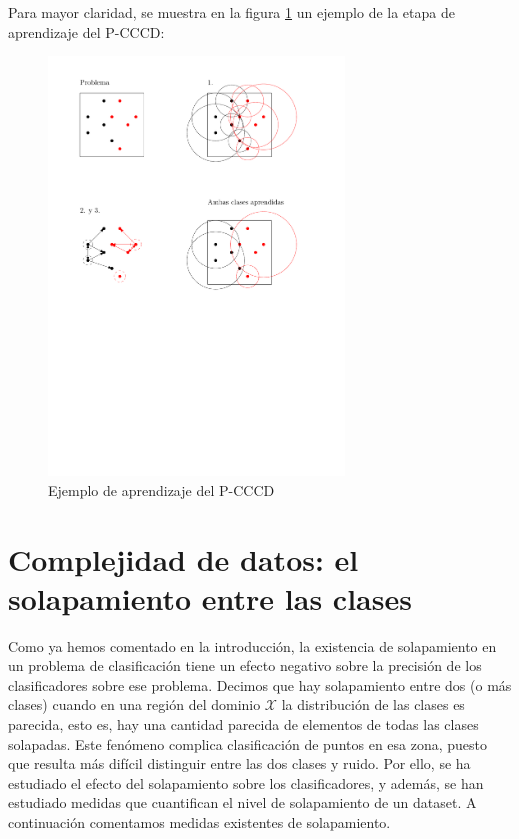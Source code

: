 \documentclass[a4paper,12pt]{report}
\theoremstyle{definition}
\begin{document}
Para mayor claridad, se muestra en la figura \ref{fig:pcccd} un ejemplo de la etapa de aprendizaje del P-CCCD:

\begin{figure}[H]
  \centering
  \includegraphics[width=0.7\textwidth]{imgs_cutres/pcccd}
  \caption{Ejemplo de aprendizaje del P-CCCD}
  \label{fig:pcccd}
\end{figure}

\section{Complejidad de datos: el solapamiento entre las clases}
\label{subsec:overlap}

Como ya hemos comentado en la introducción, la existencia de solapamiento en un problema de clasificación tiene un efecto negativo sobre la precisión de los clasificadores sobre ese problema. Decimos que hay solapamiento entre dos (o más clases) cuando en una región del dominio $\mathcal{X}$ la distribución de las clases es parecida, esto es, hay una cantidad parecida de elementos de todas las clases solapadas. Este fenómeno complica clasificación de puntos en esa zona, puesto que resulta más difícil distinguir entre las dos clases y ruido. Por ello, se ha estudiado el efecto del solapamiento sobre los clasificadores\cite{mollineda2005data}, y además, se han estudiado medidas que cuantifican el nivel de solapamiento de un dataset. A continuación comentamos medidas existentes de solapamiento.
\end{document}

